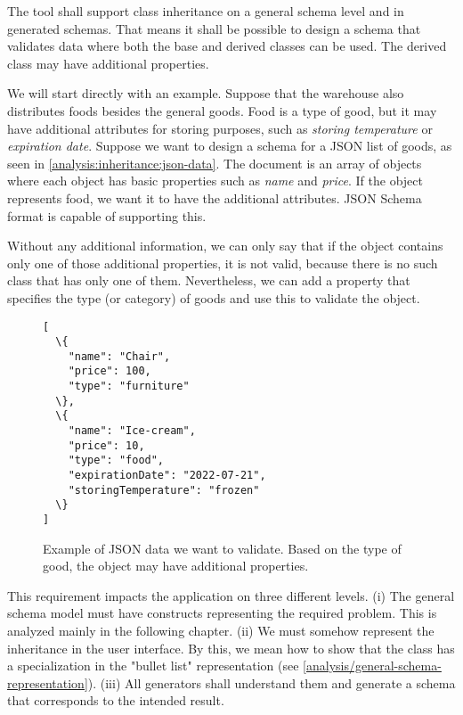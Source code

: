 

\begin{requirement}
    The tool shall support class inheritance on a general schema level and in generated schemas. That means it shall be possible to design a schema that validates data where both the base and derived classes can be used. The derived class may have additional properties.
\end{requirement}

\begin{showcase}
    We will start directly with an example. Suppose that the warehouse also distributes foods besides the general goods. Food is a type of good, but it may have additional attributes for storing purposes, such as \textit{storing temperature} or \textit{expiration date}. Suppose we want to design a schema for a JSON list of goods, as seen in \autoref{analysis:inheritance:json-data}. The document is an array of objects where each object has basic properties such as \textit{name} and \textit{price}. If the object represents food, we want it to have the additional attributes. JSON Schema format is capable of supporting this.

    Without any additional information, we can only say that if the object contains only one of those additional properties, it is not valid, because there is no such class that has only one of them. Nevertheless, we can add a property that specifies the type (or category) of goods and use this to validate the object.
    \begin{figure}[H]\centering
        \begin{Verbatim}[commandchars=\\\{\}]
[
  \{
    "name": "Chair",
    "price": 100,
    "type": "furniture"
  \},
  \{
    "name": "Ice-cream",
    "price": 10,
    "type": "food",
    "expirationDate": "2022-07-21",
    "storingTemperature": "frozen"
  \}
]
        \end{Verbatim}
        \caption{Example of JSON data we want to validate. Based on the type of good, the object may have additional properties.}
        \label{analysis:inheritance:json-data}
    \end{figure}
\end{showcase}

This requirement impacts the application on three different levels. (i) The general schema model must have constructs representing the required problem. This is analyzed mainly in the following chapter. (ii) We must somehow represent the inheritance in the user interface. By this, we mean how to show that the class has a specialization in the "bullet list" representation (see \autoref{analysis/general-schema-representation}). (iii) All generators shall understand them and generate a schema that corresponds to the intended result.

